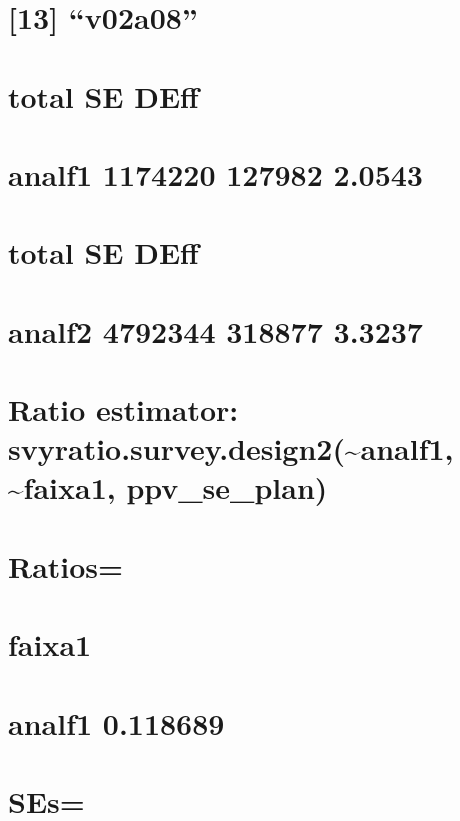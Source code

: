 \documentclass[]{book}
\theoremstyle{definition}
\theoremstyle{definition}
\theoremstyle{definition}
\theoremstyle{remark}
\begin{document}
\section{\texorpdfstring{{[}13{]}
``v02a08''}{{[}13{]} v02a08}}\label{v02a08}

\section{total SE DEff}\label{total-se-deff}

\section{analf1 1174220 127982
2.0543}\label{analf1-1174220-127982-2.0543}

\section{total SE DEff}\label{total-se-deff-1}

\section{analf2 4792344 318877
3.3237}\label{analf2-4792344-318877-3.3237}

\section{Ratio estimator:
svyratio.survey.design2(\textasciitilde{}analf1,
\textasciitilde{}faixa1,
ppv\_se\_plan)}\label{ratio-estimator-svyratio.survey.design2analf1-faixa1-ppv_se_plan}

\section{Ratios=}\label{ratios}

\section{faixa1}\label{faixa1}

\section{analf1 0.118689}\label{analf1-0.118689}

\section{SEs=}\label{ses}
\end{document}
